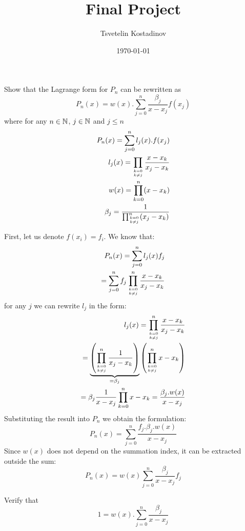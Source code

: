 \documentclass[a4paper, oneside]{article}
\title{Final Project}
\date{\today}
\author{Tsvetelin Kostadinov}
\begin{document}


\begin{problem}\label{ex:1}
Show that the Lagrange form for $P_n$ can be rewritten as
\begin{equation}
    P_n(x) = w(x).\sum_{j=0}^n \frac{\beta_j}{x - x_j}f(x_j)
\end{equation}
where for any $n \in {\mathbb{N}}$, $j \in {\mathbb{N}}$ and $j \leq n$
\begin{align}
    P_n(x) = \sum_{j=0}^n l_j(x).f(x_j)                         \\
    l_j(x) = \prod_{k=0 \atop k \neq j} \frac{x-x_k}{x_j - x_k} \\
    w(x) = \prod_{k=0}^n (x - x_k)                              \\
    \beta_j = \frac{1}{\prod_{k=0 \atop k\neq j}^n (x_j - x_k)}
\end{align}
\end{problem}
\begin{solution}
    First, let us denote $f(x_i) = f_i$. We know that:
    \begin{align}
        P_n(x) = \sum_{j=0}^n l_j(x)f_j \\
        = \sum_{j=0}^n f_j \prod_{k=0 \atop k \neq j}^n \frac{x-x_k}{x_j - x_k}
    \end{align}
    for any $j$ we can rewrite $l_j$ in the form:
    \begin{align}
        l_j(x) = \prod_{k=0 \atop k \neq j}^n \frac{x-x_k}{x_j - x_k}                                                                              \\
        = \underbrace{\left( \prod_{k=0 \atop k \neq j}^n \frac{1}{x_j - x_k}\right)}_{=\beta_j} \left(\prod_{k=0 \atop k \neq j}^n x - x_k\right) \\
        = \beta_j \frac{1}{x - x_j} \prod_{k=0}^n x - x_k= \frac{\beta_j.w(x)}{x - x_j}
    \end{align}
    Substituting the result into $P_n$ we obtain the formulation:
    \begin{equation}
        P_n(x) = \sum_{j=0}^n \frac{f_j.\beta_j.w(x)}{x-x_j}
    \end{equation}
    Since $w(x)$ does not depend on the summation index, it can be extracted outside the sum:
    \begin{equation}
        P_n(x) = w(x) \sum_{j=0}^n \frac{\beta_j}{x-x_j}f_j
    \end{equation}
\end{solution}
\begin{problem}
Verify that
\begin{equation}
    1 = w(x).\sum_{j=0}^n \frac{\beta_j}{x - x_j}
\end{equation}
\end{problem}
\end{document}

